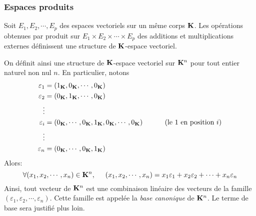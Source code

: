 \subsubsection{Espaces produits}
\begin{prop}
 Soit $E_1, E_2, \cdots, E_p$ des espaces vectoriels sur un même corps $\mathbf{K}$. Les opérations obtenues par produit sur $E_1\times E_2 \times \cdots \times E_p$ des additions et multiplications externes définissent une structure de $\mathbf{K}$-espace vectoriel.
\end{prop}
\begin{exple}
 On définit ainsi une structure de $\mathbf{K}$-espace vectoriel sur $\mathbf{K}^n$ pour tout entier naturel non nul $n$.\newline
En particulier, notons 
\begin{align*}
 \varepsilon_1 &= (1_{\mathbf{K}},0_{\mathbf{K}},\cdots,0_{\mathbf{K}})\\
 \varepsilon_2 &= (0_{\mathbf{K}},1_{\mathbf{K}},\cdots,0_{\mathbf{K}})\\
\vdots& \\
\varepsilon_i &= (0_{\mathbf{K}},\cdots,0_{\mathbf{K}},1_{\mathbf{K}},0_{\mathbf{K}},\cdots,0_{\mathbf{K}})\hspace{1cm}\text{ (le $1$ en position $i$)}\\
\vdots& \\
\varepsilon_n &= (0_{\mathbf{K}},\cdots,0_{\mathbf{K}},1_{\mathbf{K}})\\
\end{align*}
\label{base_canonique}
Alors:
\begin{displaymath}
 \forall (x_1,x_2,\cdots,x_n)\in \mathbf{K}^n,\hspace{0.5cm}
(x_1,x_2,\cdots,x_n) = x_1\varepsilon_1 + x_2\varepsilon_2 + \cdots + x_n\varepsilon_n
\end{displaymath}
Ainsi, tout vecteur de $\mathbf{K}^n$ est une combinaison linéaire des vecteurs de la famille $(\varepsilon_1,\varepsilon_2,\cdots,\varepsilon_n)$. Cette famille est appelée la \emph{base canonique} de $\mathbf{K}^n$. Le terme de base sera justifié plus loin.
\end{exple}

